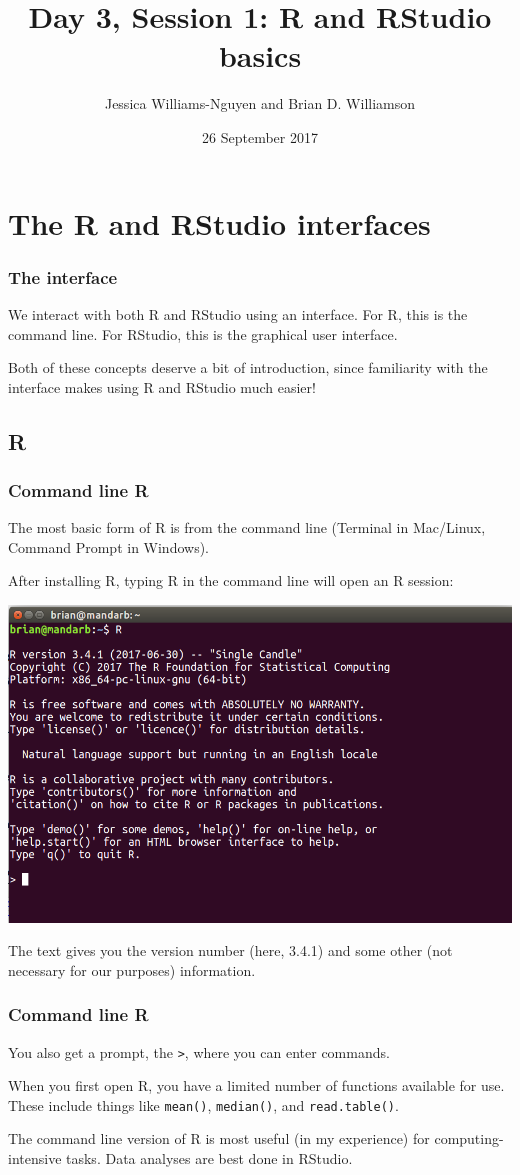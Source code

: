 \documentclass[11pt]{beamer}
\title{Day 3, Session 1: R and RStudio basics}
\author{Jessica Williams-Nguyen and Brian D. Williamson}
\institute{EPI/BIOST Bootcamp 2017}
\date{26 September 2017}
\newcommand{\myframe}[1]{\begin{frame} \frametitle{#1}}
\begin{document}
\begin{frame}
\titlepage
\end{frame}

\section{The R and RStudio interfaces}
\myframe{The interface}
We interact with both R and RStudio using an interface. For R, this is the command line. For RStudio, this is the graphical user interface.

Both of these concepts deserve a bit of introduction, since familiarity with the interface makes using R and RStudio much easier!
\end{frame}
\subsection{R}
\myframe{Command line R}
The most basic form of R is from the command line (Terminal in Mac/Linux, Command Prompt in Windows). 

After installing R, typing R in the command line will open an R session:
\begin{center}
\includegraphics[width = .6\textwidth]{figs/command_line_r.png}
\end{center}

The text gives you the version number (here, 3.4.1) and some other (not necessary for our purposes) information. 
\end{frame}

\myframe{Command line R}
You also get a prompt, the \texttt{>}, where you can enter commands. 

When you first open R, you have a limited number of functions available for use. These include things like \texttt{mean()}, \texttt{median()}, and \texttt{read.table()}. 

The command line version of R is most useful (in my experience) for computing-intensive tasks. Data analyses are best done in RStudio.
\end{frame}
\end{document}
